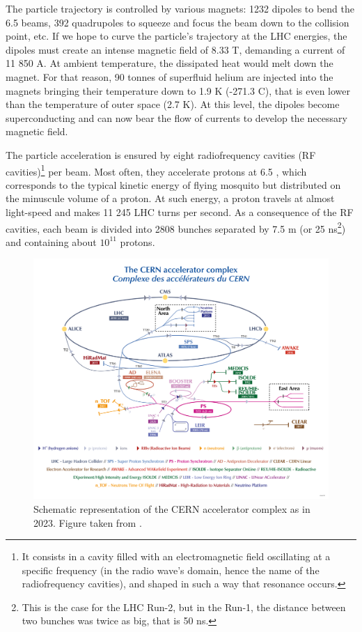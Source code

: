 The particle trajectory is controlled by various magnets: 1232 dipoles to bend the 6.5 \tev beams, 392 quadrupoles to squeeze and focus the beam down to the collision point, etc. If we hope to curve the particle's trajectory at the LHC energies, the dipoles must create an intense magnetic field of 8.33 T, demanding a current of 11 850 A. At ambient temperature, the dissipated heat would melt down the magnet. For that reason, 90 tonnes of superfluid helium are injected into the magnets bringing their temperature down to 1.9 K (-271.3 C), that is even lower than the temperature of outer space (2.7 K). At this level, the dipoles become superconducting and can now bear the flow of currents to develop the necessary magnetic field. 

The particle acceleration is ensured by eight radiofrequency cavities (RF cavities)\footnote{It consists in a cavity filled with an electromagnetic field oscillating at a specific frequency (in the radio wave's domain, hence the name of the radiofrequency cavities), and shaped in such a way that resonance occurs.} per beam. Most often, they accelerate protons at 6.5 \tev, which corresponds to the typical kinetic energy of flying mosquito but distributed on the minuscule volume of a proton. At such energy, a proton travels at almost light-speed and makes 11 245 LHC turns per second. As a consequence of the RF cavities, each beam is divided into 2808 bunches separated by 7.5 m (or 25 ns\footnote{This is the case for the LHC Run-2, but in the Run-1, the distance between two bunches was twice as big, that is 50 ns.}) and containing about $10^{11}$ protons. \\

\begin{figure}[t]
	\centering
	\includegraphics[width=1\textwidth]{Figs/Chapter3/CCC-v2022_Large.png}
	\caption{Schematic representation of the CERN accelerator complex as in 2023. Figure taken from \cite{lopienskaewaCERNAcceleratorComplex2022}.}
	\label{fig:AcceleratorComplex}
\end{figure}

